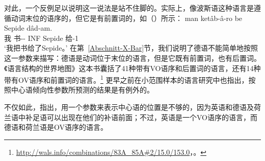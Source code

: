 对此，一个反例足以说明这一说法是站不住脚的。实际上，像波斯语这种语言是遵循动词末位的语序的，但它是有前置词的，如（）所示：
\ea
\gll man ketâb-â-ro be Sepide dâd-am.\\
     我 书-\pl-\RA{} INF Sepide  给-1\sg\\
\glt `我把书给了Sepide。'
\z
在第~\ref{Abschnitt-X-Bar}节，我们说明了德语不能简单地按照这一参数来描写：德语是动词位于末位的语言，但是它既有前置词，也有后置词。《语言结构的世界地图》这本书囊括了41种带有VO语序和后置词的语言，还有14种带有OV语序和前置词的语言\citep{wals-83,wals-85}。\footnote{
  \url{http://wals.info/combinations/83A_85A\#2/15.0/153.0}，。
} \citet{Dryer92a}更早之前在小范围样本的语言研究中也指出，按照中心语倾向性参数所预测的结果是有例外的。

不仅如此，\citet[]{GW94a}指出，用一个参数来表示中心语的位置是不够的，因为英语和德语及荷兰语中补足语可以出现在他们的补语前面；不过，英语是一个VO语序的语言，而德语和荷兰语是OV语序的语言。

